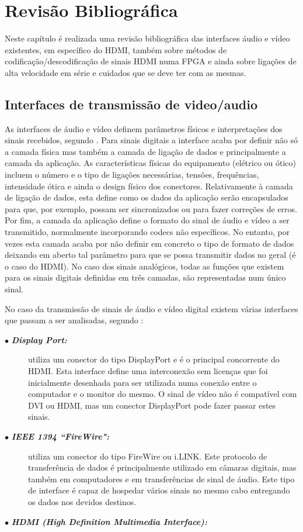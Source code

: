 \chapter{Revisão Bibliográfica} \label{chap:sota}

Neste capítulo é realizada uma revisão bibliográfica das interfaces áudio e vídeo existentes, em específico do HDMI, também sobre métodos de codificação/descodificação de sinais HDMI numa FPGA e ainda sobre ligações de alta velocidade em série e cuidados que se deve ter com as mesmas.

\section{Interfaces de transmissão de video/audio}

As interfaces de áudio e vídeo definem parâmetros físicos e interpretações dos sinais recebidos, segundo \cite{R004}. Para sinais digitais a interface acaba por definir não só a camada física mas também a camada de ligação de dados e principalmente a camada da aplicação. As características físicas do equipamento (elétrico ou ótico) incluem o número e o tipo de ligações necessárias, tensões, frequências, intensidade ótica e ainda o design físico dos conectores. Relativamente à camada de ligação de dados, esta define como os dados da aplicação serão encapsulados para que, por exemplo, possam ser sincronizados ou para fazer correções de erros. Por fim, a camada da aplicação define o formato do sinal de áudio e vídeo a ser transmitido, normalmente incorporando codecs não específicos. No entanto, por vezes esta camada acaba por não definir em concreto o tipo de formato de dados deixando em aberto tal parâmetro para que se possa transmitir dados no geral (é o caso do HDMI). No caso dos sinais analógicos, todas as funções que existem para os sinais digitais definidas em três camadas, são representadas num único sinal.

No caso da transmissão de sinais de áudio e vídeo digital existem várias interfaces que passam a ser analisadas, segundo \cite{R004}:
\begin{description}
	\item[$\bullet$  \textbf{\textit{Display Port:}}] utiliza um conector do tipo DisplayPort e é o principal concorrente do HDMI. Esta interface define uma interconexão sem licenças que foi inicialmente desenhada para ser utilizada numa conexão entre o computador e o monitor do mesmo. O sinal de vídeo não é compatível com DVI ou HDMI, mas um conector DisplayPort pode fazer passar estes sinais.
	\item[$\bullet$   \textbf{\textit{ IEEE 1394 “FireWire":}}] utiliza um conector do tipo FireWire ou i.LINK. Este protocolo de transferência de dados é principalmente utilizado em câmaras digitais, mas também em computadores e em transferências de sinal de áudio. Este tipo de interface é capaz de hospedar vários sinais no mesmo cabo entregando os dados nos devidos destinos.
	\item[$\bullet$   \textbf{\textit{HDMI (High Definition Multimedia Interface):}}]
\end{description}

